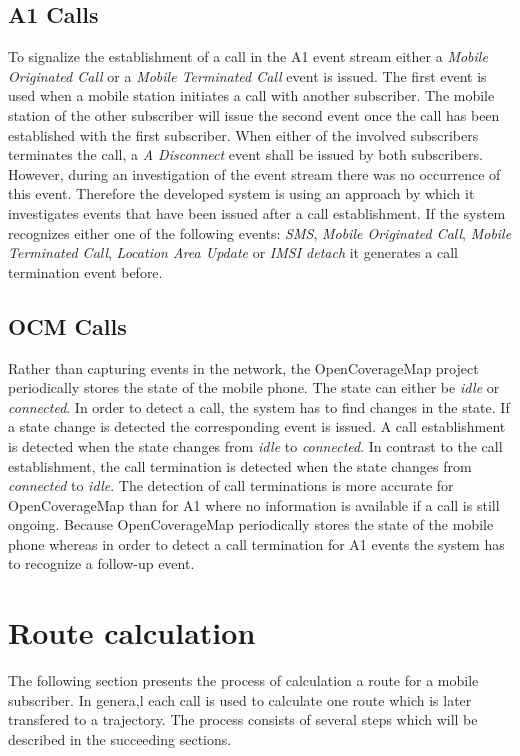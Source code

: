 \documentclass[master,english]{hgbthesis}
\begin{document}
\subsection{A1 Calls}
To signalize the establishment of a call in the A1 event stream either a \emph{Mobile Originated Call} or a \emph{Mobile Terminated Call} event is issued. The first event is used when a mobile station initiates a call with another subscriber. The mobile station of the other subscriber will issue the second event once the call has been established with the first subscriber.
When either of the involved subscribers terminates the call, a \emph{A Disconnect} event shall be issued by both subscribers. However, during an investigation of the event stream there was no occurrence of this event. Therefore the developed system is using an approach by which it investigates events that have been issued after a call establishment. If the system recognizes either one of the following events: \emph{SMS}, \emph{Mobile Originated Call}, \emph{Mobile Terminated Call}, \emph{Location Area Update} or \emph{IMSI detach} it generates a call termination event before. 
\subsection{OCM Calls}
Rather than capturing events in the network, the OpenCoverageMap project periodically stores the state of the mobile phone. The state can either be \emph{idle} or \emph{connected}. In order to detect a call, the system has to find changes in the state. If a state change is detected the corresponding event is issued. A call establishment is detected when the state changes from \emph{idle} to \emph{connected}. In contrast to the call establishment, the call termination is detected when the state changes from \emph{connected} to \emph{idle}. 
The detection of call terminations is more accurate for OpenCoverageMap than for A1 where no information is available if a call is still ongoing. Because OpenCoverageMap periodically stores the state of the mobile phone whereas in order to detect a call termination for A1 events the system has to recognize a follow-up event.
\section{Route calculation}
The following section presents the process of calculation a route for a mobile subscriber. In genera,l each call is used to calculate one route which is later transfered to a trajectory. The process consists of several steps which will be described in the succeeding sections.  
\end{document}
